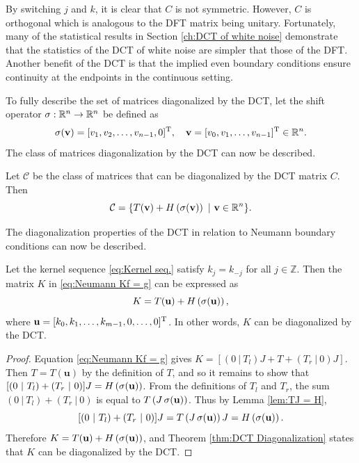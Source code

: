 By switching $j$ and $k$, it is clear that $C$ is not symmetric. However, $C$ is orthogonal which is analogous to the DFT matrix being unitary. Fortunately, many of the statistical results in Section \ref{ch:DCT of white noise} demonstrate that the statistics of the DCT of white noise are simpler that those of the DFT. Another benefit of the DCT is that the implied even boundary conditions ensure continuity at the endpoints in the continuous setting. \par
To fully describe the set of matrices diagonalized by the DCT, let the shift operator $\operatorname{\sigma}: \mathbb{R}^n \rightarrow \mathbb{R}^n$ be defined as
\[\operatorname{\sigma}(\mathbf{v}) = [v_1,v_2,\ldots,v_{n-1},0]^{\mathrm{T}}, \quad \mathbf{v} = [v_0,v_1,\ldots,v_{n-1}]^{\mathrm{T}} \in \mathbb{R}^n.\] 
The class of matrices diagonalization by the DCT can now be described.
\begin{theorem}
\label{thm:DCT Diagonalization}
Let $\mathcal{C}$ be the class of matrices that can be diagonalized by the DCT matrix $C$. Then
\[\mathcal{C} = \{T(\mathbf{v}) + H\left(\operatorname{\sigma}(\mathbf{v})\right) ~|~ \mathbf{v} \in \mathbb{R}^n\}.\]
\end{theorem}
The diagonalization properties of the DCT in relation to Neumann boundary conditions can now be described.
\begin{theorem}
\label{thm:Neumann Diagonalization}
Let the kernel sequence \eqref{eq:Kernel seq.} satisfy $k_j = k_{-j}$ for all $j \in \mathbb{Z}$. Then the matrix $K$ in \eqref{eq:Neumann Kf = g} can be expressed as
\[K = T(\mathbf{u}) + H\left(\operatorname{\sigma}(\mathbf{u})\right),\]
where $\mathbf{u} = [k_0,k_1,\ldots,k_{m-1},0,\ldots,0]^{\mathrm{T}}$. In other words, $K$ can be diagonalized by the DCT.
\end{theorem}
\begin{proof}
Equation \eqref{eq:Neumann Kf = g} gives $K = [(0~|~T_{l})J + T + (T_{r}~|~0)J]$. Then $T = T(\mathbf{u})$ by the definition of $T$, and so it remains to show that $[(0~|~T_{l}) + (T_{r}~|~0)]J = H\left(\operatorname{\sigma}(\mathbf{u})\right)$. From the definitions of $T_{l}$ and $T_{r}$, the sum $(0~|~T_{l}) + (T_{r}~|~0)$ is equal to $T\left(J\operatorname{\sigma}(\mathbf{u})\right)$. Thus by Lemma \ref{lem:TJ = H},
\[[(0~|~T_{l}) + (T_{r}~|~0)]J = T\left(J\operatorname{\sigma}(\mathbf{u})\right)J = H\left(\operatorname{\sigma}(\mathbf{u})\right).\]
Therefore $K = T(\mathbf{u}) + H\left(\operatorname{\sigma}(\mathbf{u})\right)$, and Theorem \ref{thm:DCT Diagonalization} states that $K$ can be diagonalized by the DCT. 
\end{proof}

